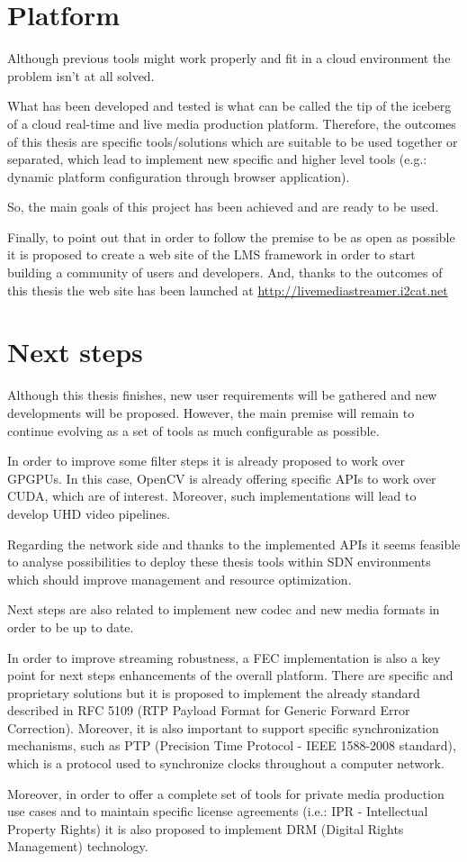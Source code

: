 \section{Platform}

Although previous tools might work properly and fit in a cloud environment the problem isn't at all solved. 

What has been developed and tested is what can be called the tip of the iceberg of a cloud real-time and live media production platform. Therefore, the outcomes of this thesis are specific tools/solutions which are suitable to be used together or separated, which lead to implement new specific and higher level tools (e.g.: dynamic platform configuration through browser application). 

So, the main goals of this project has been achieved and are ready to be used.

Finally, to point out that in order to follow the premise to be as open as possible it is proposed to create a web site of the LMS framework in order to start building a community of users and developers. And, thanks to the outcomes of this thesis the web site has been launched at \href{http://livemediastreamer.i2cat.net}{http://livemediastreamer.i2cat.net}

\section{Next steps}

Although this thesis finishes, new user requirements will be gathered and new developments will be proposed. However, the main premise will remain to continue evolving as a set of tools as much configurable as possible.

In order to improve some filter steps it is already proposed to work over GPGPUs. In this case, OpenCV is already offering specific APIs to work over CUDA, which are of interest. Moreover, such implementations will lead to develop UHD video pipelines.

Regarding the network side and thanks to the implemented APIs it seems feasible to analyse possibilities to deploy these thesis tools within SDN environments which should improve management and resource optimization.

Next steps are also related to implement new codec and new media formats in order to be up to date. 

In order to improve streaming robustness, a FEC implementation is also a key point for next steps enhancements of the overall platform. There are specific and proprietary solutions but it is proposed to implement the already standard described in RFC 5109 (RTP Payload Format for Generic Forward Error Correction). Moreover, it is also important to  support specific synchronization mechanisms, such as PTP (Precision Time Protocol - IEEE 1588-2008 standard), which is a protocol used to synchronize clocks throughout a computer network.

Moreover, in order to offer a complete set of tools for private media production use cases and to maintain specific license agreements (i.e.: IPR - Intellectual Property Rights) it is also proposed to implement DRM (Digital Rights Management) technology.
